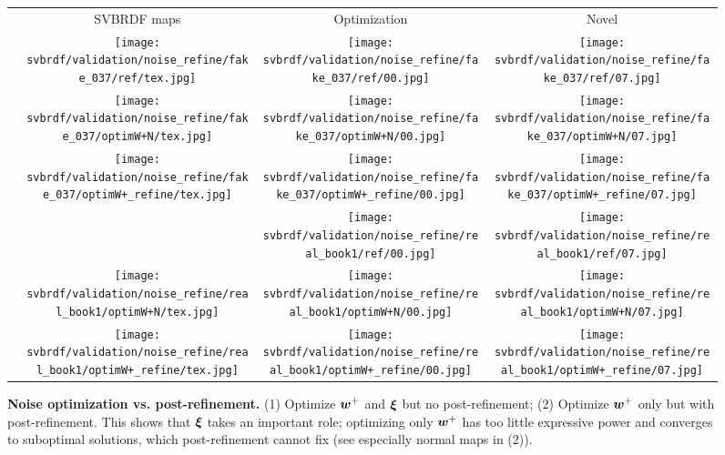 \begin{figure}[!ht]
	\centering
	\setlength{\resLen}{1.in}
	\setlength{\raiseLen}{0.4in}
	\addtolength{\tabcolsep}{-4pt}
	\begin{tabular}{cccc}
		& SVBRDF maps & Optimization & Novel
		\\
		\raisebox{\raiseLen}{\rotatebox[origin=c]{90}{GT}} &
		\texttt{[image: svbrdf/validation/noise\_refine/fake\_037/ref/tex.jpg]} &
		\texttt{[image: svbrdf/validation/noise\_refine/fake\_037/ref/00.jpg]} &
		\texttt{[image: svbrdf/validation/noise\_refine/fake\_037/ref/07.jpg]}
		\\
		\raisebox{\raiseLen}{\rotatebox[origin=c]{0}{(1)}} &
		\texttt{[image: svbrdf/validation/noise\_refine/fake\_037/optimW+N/tex.jpg]} &
		\texttt{[image: svbrdf/validation/noise\_refine/fake\_037/optimW+N/00.jpg]} &
		\texttt{[image: svbrdf/validation/noise\_refine/fake\_037/optimW+N/07.jpg]}
		\\
		\raisebox{\raiseLen}{\rotatebox[origin=c]{0}{(2)}} &
		\texttt{[image: svbrdf/validation/noise\_refine/fake\_037/optimW+\_refine/tex.jpg]} &
		\texttt{[image: svbrdf/validation/noise\_refine/fake\_037/optimW+\_refine/00.jpg]} &
		\texttt{[image: svbrdf/validation/noise\_refine/fake\_037/optimW+\_refine/07.jpg]}
		\\
		\raisebox{\raiseLen}{\rotatebox[origin=c]{90}{GT}} &
		 &
		\texttt{[image: svbrdf/validation/noise\_refine/real\_book1/ref/00.jpg]} &
		\texttt{[image: svbrdf/validation/noise\_refine/real\_book1/ref/07.jpg]}
		\\
		\raisebox{\raiseLen}{\rotatebox[origin=c]{0}{(1)}} &
		\texttt{[image: svbrdf/validation/noise\_refine/real\_book1/optimW+N/tex.jpg]} &
		\texttt{[image: svbrdf/validation/noise\_refine/real\_book1/optimW+N/00.jpg]} &
		\texttt{[image: svbrdf/validation/noise\_refine/real\_book1/optimW+N/07.jpg]}
		\\
		\raisebox{\raiseLen}{\rotatebox[origin=c]{0}{(2)}} &
		\texttt{[image: svbrdf/validation/noise\_refine/real\_book1/optimW+\_refine/tex.jpg]} &
		\texttt{[image: svbrdf/validation/noise\_refine/real\_book1/optimW+\_refine/00.jpg]} &
		\texttt{[image: svbrdf/validation/noise\_refine/real\_book1/optimW+\_refine/07.jpg]}
	\end{tabular}
	\caption[Noise optimization vs. post-refinement]{\label{fig:svbrdf:noise_vs_refine}
		\textbf{Noise optimization vs. post-refinement.} (1) Optimize $\bm{w}^+$ and $\bm\xi$ but no post-refinement; (2) Optimize $\bm{w}^+$ only but with post-refinement. This shows that $\bm\xi$ takes an important role; optimizing only $\bm{w}^+$ has too little expressive power and converges to suboptimal solutions, which post-refinement cannot fix (see especially normal maps in (2)).
	}
\end{figure}